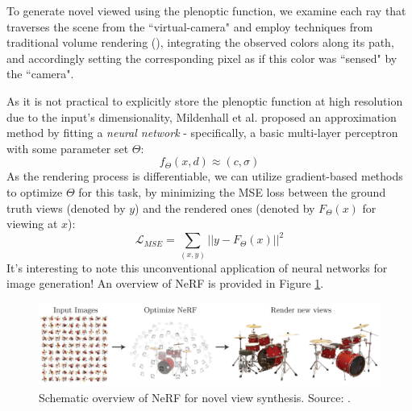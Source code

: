 \documentclass{article}
\begin{document}
\medskip
\noindent
To generate novel viewed using the plenoptic function, we examine each ray that traverses the scene from the ``virtual-camera" and employ techniques from traditional volume rendering (\citet{kajiya1984ray}), integrating the observed colors along its path, and accordingly setting the corresponding pixel as if this color was ``sensed" by the ``camera".

\medskip
\noindent
As it is not practical to explicitly store the plenoptic function at high resolution due to the input's dimensionality, Mildenhall et al. proposed an approximation method by fitting a \emph{neural network} - specifically, a basic multi-layer perceptron with some parameter set $\Theta$:
\begin{equation*}
    f_{\Theta}(x, d) \approx (c,\sigma)
\end{equation*}
As the rendering process is differentiable, we can utilize gradient-based methods to optimize $\Theta$ for this task, by minimizing the MSE loss between the ground truth views (denoted by $y$) and the rendered ones (denoted by $F_{\Theta}(x)$ for viewing at $x$):
\begin{equation*}
    \mathcal{L}_{MSE} = \sum_{(x,y)}||y - F_{\Theta}(x)||^2
\end{equation*}
It's interesting to note this unconventional application of neural networks for image generation! An overview of NeRF is provided in Figure \ref{fig:nerf_overview}.

\begin{figure}[ht!]
    \begin{center}
        \includegraphics[width=1.0\textwidth]{figures/nerf_overview.png}
    \end{center}
    \caption{
        Schematic overview of NeRF for novel view synthesis. Source: \citet{mildenhall2020nerf}.
    }
    \label{fig:nerf_overview}
\end{figure}
\end{document}
